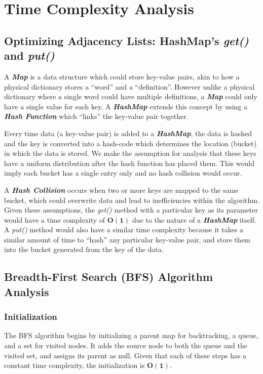 \section*{\textbf{Time Complexity Analysis}}

\subsection*{\textbf{Optimizing Adjacency Lists: HashMap's \textit{get()} and \textit{put()}}}
A \textit{\textbf{Map}} is a data structure which could store key-value pairs, akin to how a physical dictionary stores a “word” and a “definition”. However unlike a physical dictionary where a single word could have multiple definitions, a \textit{\textbf{Map}} could only have a single value for each key. A \textit{\textbf{HashMap}} extends this concept by using a \textit{\textbf{Hash Function}} which “links” the key-value pair together.

Every time data (a key-value pair) is added to a \textit{\textbf{HashMap}}, the data is hashed and the key is converted into a hash-code which determines the location (bucket) in which the data is stored. We make the assumption for analysis that these keys have a uniform distribution after the hash function has placed them. This would imply each bucket has a single entry only and no hash collision would occur.

A \textit{\textbf{Hash Collision}} occurs when two or more keys are mapped to the same bucket, which could overwrite data and lead to inefficiencies within the algorithm. Given these assumptions, the \textit{get()} method with a particular key as its parameter would have a time complexity of $\mathbf{O(1)}$ due to the nature of a \textit{\textbf{HashMap}} itself. A \textit{put()} method would also have a similar time complexity because it takes a similar amount of time to “hash” any particular key-value pair, and store them into the bucket generated from the key of the data. \cite{bajracharya}

\subsection*{\textbf{Breadth-First Search (BFS) Algorithm Analysis}}

\subsubsection*{Initialization}
The BFS algorithm begins by initializing a parent map for backtracking, a queue, and a set for visited nodes. It adds the source node to both the queue and the visited set, and assigns its parent as null. Given that each of these steps has a constant time complexity, the initialization is $\mathbf{O(1)}$.

